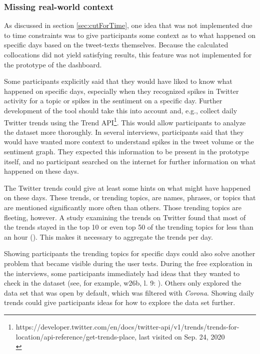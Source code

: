 \subsubsection*{Missing real-world context}
As discussed in section \ref{sec:cutForTime}, one idea that was not implemented due to time constraints was to give participants some context as to what happened on specific days based on the tweet-texts themselves. Because the calculated collocations did not yield satisfying results, this feature was not implemented for the prototype of the dashboard.

Some participants explicitly said that they would have liked to know what happened on specific days, especially when they recognized spikes in Twitter activity for a topic or spikes in the sentiment on a specific day. Further development of the tool should take this into account and, e.g., collect daily Twitter trends using the Trend API\footnote{https://developer.twitter.com/en/docs/twitter-api/v1/trends/trends-for-location/api-reference/get-trends-place, last visited on Sep. 24, 2020 \\}. This would allow participants to analyze the dataset more thoroughly. In several interviews, participants said that they would have wanted more context to understand spikes in the tweet volume or the sentiment graph. They expected this information to be present in the prototype itself, and no participant searched on the internet for further information on what happened on these days.

The Twitter trends could give at least some hints on what might have happened on these days. These trends, or trending topics, are names, phrases, or topics that are mentioned significantly more often than others. Those trending topics are fleeting, however. A study examining the trends on Twitter found that most of the trends stayed in the top 10 or even top 50 of the trending topics for less than an hour (\cite{annamoradnejadComprehensiveAnalysisTwitter2019}). This makes it necessary to aggregate the trends per day.

Showing participants the trending topics for specific days could also solve another problem that became visible during the user tests. During the free exploration in the interviews, some participants immediately had ideas that they wanted to check in the dataset (see, for example, w26b, l. 9: ). Others only explored the data set that was open by default, which was filtered with \emph{Corona}. Showing daily trends could give participants ideas for how to explore the data set further.

